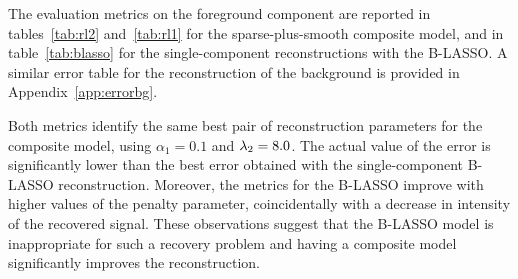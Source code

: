 \documentclass[12pt]{article}
\begin{document}
        The evaluation metrics on the foreground component are reported in tables~\ref{tab:rl2} and~\ref{tab:rl1} for the sparse-plus-smooth composite model, and in table~\ref{tab:blasso} for the single-component reconstructions with the B-LASSO. A similar error table for the reconstruction of the background is provided in Appendix~\ref{app:errorbg}.

        Both metrics identify the same best pair of reconstruction parameters for the composite model, using $\alpha_1 = 0.1$ and $\lambda_{2} = 8.0$. %
        The actual value of the error is significantly lower than the best error obtained with the single-component B-LASSO reconstruction. Moreover, the metrics for the B-LASSO improve with higher values of the penalty parameter, coincidentally with a decrease in intensity of the recovered signal. These observations suggest that the B-LASSO model is inappropriate for such a recovery problem and having a composite model significantly improves the reconstruction. 
        
\end{document}
